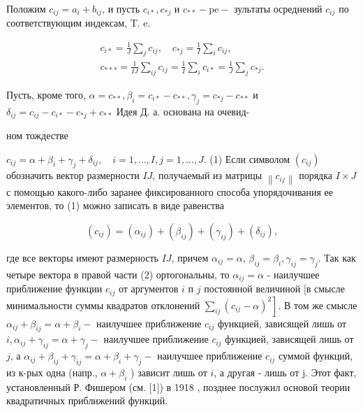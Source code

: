 \documentclass[10pt]{article}
\begin{document}
Положим $c_{i j}=a_{i}+b_{i j}$, и пусть $c_{i *}, c_{* j}$ и $c_{* *}-\mathrm{pe}-$ зультаты осреднений $c_{i j}$ по соответствующим индексам, T. e.



\[

\begin{gathered}

c_{i *}=\frac{1}{J} \sum_{j} c_{i j}, \quad c_{* j}=\frac{1}{I} \sum_{i} c_{i j}, \\

c_{* * *}=\frac{1}{I J} \sum_{i j} c_{i j}=\frac{1}{I} \sum_{i} c_{i *}=\frac{1}{J} \sum_{j} c_{* j} .

\end{gathered}

\]



Пусть, кроме того, $\alpha=c_{* *}, \beta_{i}=c_{i *}-c_{* *}, \gamma_{j}=c_{* j}-c_{* *}$ и $\delta_{i j}=c_{i j}-c_{i *}-c_{* j}+c_{* *}$ Идея Д. а. основана на очевид-

ном тождестве



$c_{i j}=\alpha+\beta_{i}+\gamma_{j}+\delta_{i j}, \quad i=1, \ldots, I, j=1, \ldots, J$. (1) Если символом $\left(c_{i j}\right)$ обозначить вектор размерности $I J$, получаемый из матрицы $\left\|c_{i j}\right\|$ порядка $I \times J$ с помощью какого-либо заранее фиксированного способа упорядочивания ее элементов, то (1) можно записать в виде равенства



\[

\left(c_{i j}\right)=\left(\alpha_{i j}\right)+\left(\beta_{i j}\right)+\left(\gamma_{i j}\right)+\left(\delta_{i j}\right),

\]



где все векторы имеют размерность $I J$, причем $\alpha_{i j}=\alpha$, $\beta_{i j}=\beta_{i}, \gamma_{i j}=\gamma_{j}$. Так как четыре вектора в правой части (2) ортогональны, то $\alpha_{i j}=\alpha$ - наилучшее приближение функции $c_{i j}$ от аргументов $i$ п $j$ постоянной величиной [в смысле минимальности суммы квадратов отклонений $\left.\sum_{i j}\left(c_{i j}-\alpha\right)^{2}\right]$. В том же смысле $\alpha_{i j}+\beta_{i j}=\alpha+\beta_{i}-$ наилучшее приближение $c_{i j}$ функцией, зависящей лишь от $i, \alpha_{i j}+\gamma_{i j}=\alpha+\gamma_{j}-$ наилучшее приближение $c_{i j}$ функцией, зависящей лишь от $j$, а $\alpha_{i j}+\beta_{i j}+\gamma_{i j}=\alpha+\beta_{i}+\gamma_{j}-$ наилучшее приближение $c_{i j}$ суммой функций, из к-рых одна (напр., $\alpha+\beta_{i}$ ) зависит лишь от $i$, а другая - лишь от j. Этот факт, установленный Р. Фишером (см. [1]) в 1918 , позднее послужил основой теории квадратичных приближений функций.
\end{document}

